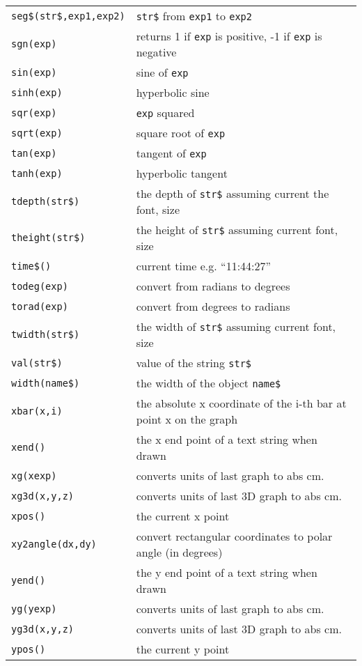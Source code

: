 \begin{supertabular}{ll}
{\tt seg\$(str\$,exp1,exp2)}    & {\tt str\$} from {\tt exp1} to {\tt exp2} \\
{\tt sgn(exp)}          	& returns 1 if {\tt exp} is positive, -1 if {\tt exp} is negative \\
{\tt sin(exp)}          	& sine of {\tt exp} \\
{\tt sinh(exp)}        	& hyperbolic sine \\
{\tt sqr(exp)}          	& {\tt exp} squared  \\
{\tt sqrt(exp)}        	& square root of {\tt exp} \\
{\tt tan(exp)}          	& tangent of {\tt exp} \\	 
{\tt tanh(exp)}        	& hyperbolic tangent \\
{\tt tdepth(str\$)}  	& the depth of {\tt str\$} assuming current the font, size \\
{\tt theight(str\$)}   & the height of {\tt str\$} assuming  current font, size \\
{\tt time\$()}       	& current time e.g. ``11:44:27'' \\
{\tt todeg(exp)}      	& convert from radians to degrees \\
{\tt torad(exp)}      	& convert from degrees to radians \\
{\tt twidth(str\$)}  	& the width of {\tt str\$} assuming current font, size \\
{\tt val(str\$)}        	& value of the string {\tt str\$} \\
{\tt width(name\$)}  	& the width of the object {\tt name\$} \\
{\tt xbar(x,i)}         	& the absolute x coordinate of the i-th bar at point x on the graph \\
{\tt xend()}           	& the x end point of a text string when drawn \\
{\tt xg(xexp)}              & converts units of last graph to abs cm. \\
{\tt xg3d(x,y,z)}         & converts units of last 3D graph to abs cm. \\
{\tt xpos()}           	& the current x point \\
{\tt xy2angle(dx,dy)} & convert rectangular coordinates to polar angle (in degrees)\\
{\tt yend()}           	& the y end point of a text string when drawn \\
{\tt yg(yexp)}              & converts units of last graph to abs cm. \\
{\tt yg3d(x,y,z)}         & converts units of last 3D graph to abs cm. \\
{\tt ypos()}           	& the current y point \\
\end{supertabular}

